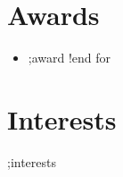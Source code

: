 \documentclass[margin,line]{res}
\begin{document}
\begin{sloppypar}
\begin{resume}
\section{Awards}
\begin{itemize}
    !for ;award in ;awards
        \item ;award
    !end for
\end{itemize}


\section{Interests}
;interests


\vfill

\end{resume}
\end{sloppypar}
\end{document}
